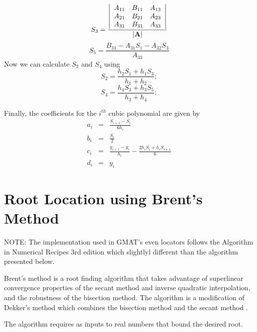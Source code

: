 %
\begin{equation}
    S_3 = \frac{
    \left|%
    \begin{array}{ccc}
       A_{11} & B_{11} & A_{13} \\
       A_{21} & B_{21} & A_{23} \\
       A_{31} & B_{31} & A_{33} \\
    \end{array}%
    \right|
    }
    {\mathbf{| \mathbf{A}|}}
\end{equation}
%
\begin{equation}
     S_5 = \frac{B_{31} - A_{31} S_1 - A_{32} S_3}{A_{33}}
\end{equation}
%
Now we can calculate $S_2$ and $S_4$ using
%
\begin{equation}
     S_2 = \frac{ h_2 S_1 + h_1 S_3  }{  h_1 + h_2 };
\end{equation}
%
\begin{equation}
     S_4 = \frac{ h_4 S_3 + h_3 S_5  }{  h_3 + h_4 };
\end{equation}
%

Finally, the coefficients for the $i^{th}$ cubic polynomial are
given by
\begin{eqnarray}
   a_i &=&  \frac{ S_{i+1} - S_i   }{ 6  h_i}\\
   b_i &=&  \frac{S_i}{2}\\
   c_i &=&  \frac{ y_{i+1} - y_i  }{ h_i } - \frac{ 2 h_i S_i + h_i S_{i+1} }{  6
   }\\
   d_i &=&  y_i
\end{eqnarray}


\section{Root Location using Brent's Method}

NOTE: The implementation used in GMAT's even locators follows the Algorithm
in Numerical Recipes 3rd edition which slightlyl different than the algorithm presented below.

Brent's\cite{Brent:73} method is a root finding algorithm that takes
advantage of superlinear convergence properties of the secant method
and inverse quadratic interpolation, and the robustness of the
bisection method.  The algorithm is a modification of Dekker's
method which combines the bisection method and the secant method
\cite{Dekker:69}.

The algorithm requires as inputs to real numbers that bound the
desired root.

